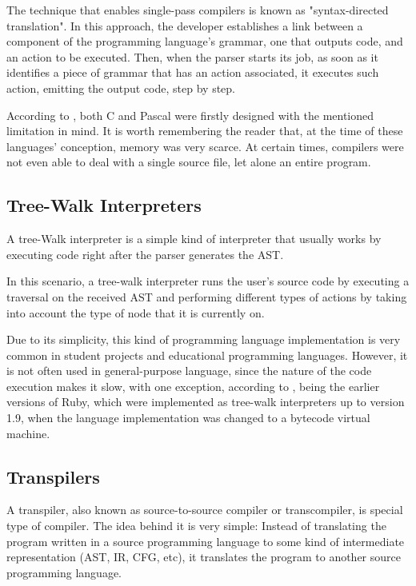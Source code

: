 The technique that enables single-pass compilers is known as "syntax-directed translation". In this approach, the developer establishes a link between a component of the programming language's grammar, one that outputs code, and an action to be executed. Then, when the parser starts its job, as soon as it identifies a piece of grammar that has an action associated, it executes such action, emitting the output code, step by step.

According to \cite{nystrom2021crafting}, both C and Pascal were firstly designed with the mentioned limitation in mind. It is worth remembering the reader that, at the time of these languages' conception, memory was very scarce. At certain times, compilers were not even able to deal with a single source file, let alone an entire program.

\subsection{Tree-Walk Interpreters}
A tree-Walk interpreter is a simple kind of interpreter that usually works by executing code right after the parser generates the AST.

In this scenario, a tree-walk interpreter runs the user's source code by executing a traversal on the received AST and performing different types of actions by taking into account the type of node that it is currently on.

Due to its simplicity, this kind of programming language implementation is very common in student projects and educational programming languages. However, it is not often used in general-purpose language, since the nature of the code execution makes it slow, with one exception, according to \cite{nystrom2021crafting}, being the earlier versions of Ruby, which were implemented as tree-walk interpreters up to version 1.9, when the language implementation was changed to a bytecode virtual machine.

\subsection{Transpilers}
A transpiler, also known as source-to-source compiler or transcompiler, is special type of compiler. The idea behind it is very simple: Instead of translating the program written in a source programming language to some kind of intermediate representation (AST, IR, CFG, etc), it translates the program to another source programming language.

